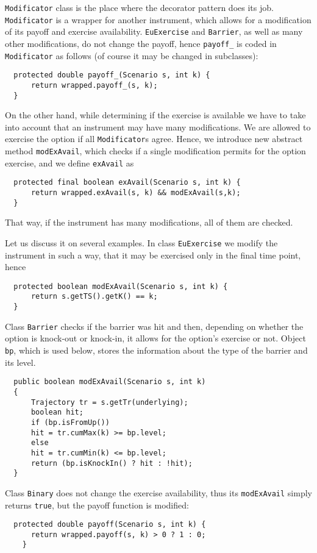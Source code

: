 \documentclass[a4paper,11pt, twoside]{book}
\theoremstyle{definition}
\theoremstyle{remark}
\begin{document}
\texttt{Modificator} class is the place where the decorator pattern does its job. \texttt{Modificator} is a wrapper for another instrument, which allows for a modification of its payoff and exercise availability. \texttt{EuExercise} and \texttt{Barrier}, as well as many other modifications, do not change the payoff, hence \texttt{payoff\_} is coded in \texttt{Modificator} as follows (of course it may be changed in subclasses):
\begin{lstlisting}
  protected double payoff_(Scenario s, int k) {
      return wrapped.payoff_(s, k);
  }
\end{lstlisting}
On the other hand, while determining if the exercise is available we have to take into account that an instrument may have many modifications. We are allowed to exercise the option if all \texttt{Modificator}s agree. Hence, we introduce new abstract method \texttt{modExAvail}, which checks if a single modification permits for the option exercise, and we define \texttt{exAvail} as
\begin{lstlisting}
  protected final boolean exAvail(Scenario s, int k) {
      return wrapped.exAvail(s, k) && modExAvail(s,k);
  }
\end{lstlisting}
That way, if the instrument has many modifications, all of them are checked.

Let us discuss it on several examples. In class \texttt{EuExercise} we modify the instrument in such a way, that it may be exercised only in the final time point, hence
\begin{lstlisting}
  protected boolean modExAvail(Scenario s, int k) {
      return s.getTS().getK() == k;
  }
\end{lstlisting}
Class \texttt{Barrier} checks if the barrier was hit and then, depending on whether the option is knock-out or knock-in, it allows for the option's exercise or not. Object \texttt{bp}, which is used below, stores the information about the type of the barrier and its level.
\begin{lstlisting}
  public boolean modExAvail(Scenario s, int k)
  {
      Trajectory tr = s.getTr(underlying);
      boolean hit;
      if (bp.isFromUp())
	  hit = tr.cumMax(k) >= bp.level;
      else
	  hit = tr.cumMin(k) <= bp.level;
      return (bp.isKnockIn() ? hit : !hit);
  }
\end{lstlisting}
Class \texttt{Binary} does not change the exercise availability, thus its \texttt{modExAvail} simply returns \texttt{true}, but the payoff function is modified:
\begin{lstlisting}
  protected double payoff(Scenario s, int k) {
      return wrapped.payoff(s, k) > 0 ? 1 : 0;
    }
\end{lstlisting}
	
\end{document}
